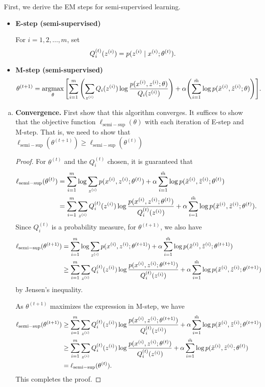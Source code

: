 \documentclass[12pt,letterpaper,boxed]{hmcpset}
\DeclareMathOperator*{\argmax}{argmax}
\newcommand{\lsemi}{\ell_{\mathrm{semi-sup}}}
\newcommand{\tht}{\theta^{(t)}}
\newcommand{\thtt}{\theta^{(t+1)}}
\begin{document}
\begin{solution}
  First, we derive the EM steps for semi-supervised learning.
  \begin{itemize}
    \item \textbf{E-step (semi-supervised)}
    
    For $i = 1, 2, \dots, m$, set
    \[
    Q_i^{(t)} (\zz) = p(\zz \mid \xx; \theta^{(t)}).
    \]

    \item \textbf{M-step (semi-supervised)}
    \[
    \theta^{(t+1)} = \argmax_{\theta} \qty[ \sum_{i=1}^m \qty(\sum_{\zz} Q_i(\zz) \log \frac{p(\xx, \zz; \theta)}{Q_i(\zz)} )+ \alpha \qty(\sum_{i=1}^{\tilde{m}} \log p(\txx, \tzz; \theta))].
    \]
  \end{itemize}

  \begin{enumerate}[(a)]
    \item \textbf{Convergence.} First show that this algorithm converges. It suffices to show that the objective function $\lsemi(\theta)$ with each iteration of E-step and M-step. That is, we need to show that $\lsemi(\theta^{(t+1)}) \geq \lsemi(\theta^{(t)})$  
    
    \begin{proof}
      For $\tht$ and the $Q_i^{(t)}$ chosen, it is guaranteed that
      \[
      \begin{aligned}
        \lsemi(\tht) &= \sum_{i=1}^m \log \sum_{\zz} p(\xx, \zz;\tht) + \alpha \sum_{i=1}^{\tilde{m}} \log p(\txx, \tzz; \tht) \\
        &= \sum_{i=1}^m \sum_{\zz} Q_i^{(t)}(\zz) \log \frac{p(\xx, \zz;\tht)}{Q_i^{(t)}(\zz)} + \alpha \sum_{i=1}^{\tilde{m}} \log p(\txx, \tzz; \tht).
      \end{aligned}
      \]
      Since $Q_i^{(t)}$ is a probability measure, for $\thtt$, we also have
      \[
      \begin{aligned}
        \lsemi(\thtt) &= \sum_{i=1}^m \log \sum_{\zz} p(\xx, \zz;\thtt) + \alpha \sum_{i=1}^{\tilde{m}} \log p(\txx, \tzz; \thtt) \\
        &\geq \sum_{i=1}^m \sum_{\zz} Q_i^{(t)}(\zz) \log \frac{p(\xx, \zz;\thtt)}{Q_i^{(t)}(\zz)} + \alpha \sum_{i=1}^{\tilde{m}} \log p(\txx, \tzz; \thtt)
      \end{aligned}
      \]
      by Jensen's inequality.
      
      As $\thtt$ maximizes the expression in M-step, we have
      \[
      \begin{aligned}
        \lsemi(\thtt) 
        &\geq \sum_{i=1}^m \sum_{\zz} Q_i^{(t)}(\zz) \log \frac{p(\xx, \zz;\thtt)}{Q_i^{(t)}(\zz)} + \alpha \sum_{i=1}^{\tilde{m}} \log p(\txx, \tzz; \thtt) \\
        &\geq \sum_{i=1}^m \sum_{\zz} Q_i^{(t)}(\zz) \log \frac{p(\xx, \zz;\tht)}{Q_i^{(t)}(\zz)} + \alpha \sum_{i=1}^{\tilde{m}} \log p(\txx, \tzz; \tht) \\
        &= \lsemi(\tht).
      \end{aligned}
      \]
      This completes the proof.
    \end{proof}
  \end{enumerate}


\end{solution}
\end{document}
